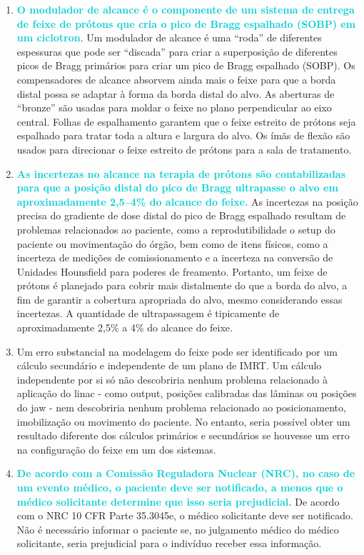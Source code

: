 \documentclass[11pt,a4paper]{article}
\begin{document}
\begin{enumerate}
        \item \textcolor{DarkTurquoise}{\textbf{O modulador de alcance é o componente de um sistema de entrega de feixe de prótons que cria o pico de Bragg espalhado (SOBP) em um ciclotron}}. Um modulador de alcance é uma ``roda'' de diferentes espessuras que pode ser ``discada'' para criar a superposição de diferentes picos de Bragg primários para criar um pico de Bragg espalhado (SOBP). Os compensadores de alcance absorvem ainda mais o feixe para que a borda distal possa se adaptar à forma da borda distal do alvo. As aberturas de ``bronze'' são usadas para moldar o feixe no plano perpendicular ao eixo central. Folhas de espalhamento garantem que o feixe estreito de prótons seja espalhado para tratar toda a altura e largura do alvo. Os ímãs de flexão são usados para direcionar o feixe estreito de prótons para a sala de tratamento.
    
        \item \textcolor{DarkTurquoise}{\textbf{As incertezas no alcance na terapia de prótons são contabilizadas para que a posição distal do pico de Bragg ultrapasse o alvo em aproximadamente 2,5–4\% do alcance do feixe.}} As incertezas na posição precisa do gradiente de dose distal do pico de Bragg espalhado resultam de problemas relacionados ao paciente, como a reprodutibilidade o setup do paciente ou movimentação do órgão, bem como de itens físicos, como a incerteza de medições de comissionamento e a incerteza na conversão de Unidades Hounsfield para poderes de freamento. Portanto, um feixe de prótons é planejado para cobrir mais distalmente do que a borda do alvo, a fim de garantir a cobertura apropriada do alvo, mesmo considerando essas incertezas. A quantidade de ultrapassagem é tipicamente de aproximadamente 2,5\% a 4\% do alcance do feixe.
    
        \item Um erro substancial na modelagem do feixe pode ser identificado por um cálculo secundário e independente de um plano de IMRT. Um cálculo independente por si só não descobriria nenhum problema relacionado à aplicação do linac - como output, posições calibradas das lâminas ou posições do jaw - nem descobriria nenhum problema relacionado ao posicionamento, imobilização ou movimento do paciente. No entanto, seria possível obter um resultado diferente dos cálculos primários e secundários se houvesse um erro na configuração do feixe em um dos sistemas.
    
        \item \textcolor{DarkTurquoise}{\textbf{De acordo com a Comissão Reguladora Nuclear (NRC), no caso de um evento médico, o paciente deve ser notificado, a menos que o médico solicitante determine que isso seria prejudicial.}} De acordo com o NRC 10 CFR Parte 35.3045e, o médico solicitante deve ser notificado. Não é necessário informar o paciente se, no julgamento médico do médico solicitante, seria prejudicial para o indivíduo receber essa informação.
    

\end{enumerate}
\end{document}

